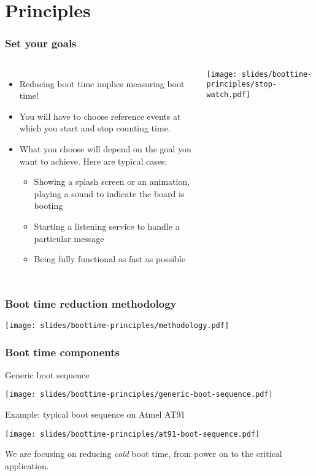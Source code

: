 \section{Principles}

\begin{frame}
\frametitle{Set your goals}
\begin{columns}
    \begin{itemize}
	\item Reducing boot time implies measuring boot time!
	\item You will have to choose reference events at which you
       	      start and stop counting time.
	\item What you choose will depend on the goal you want to
              achieve. Here are typical cases:
	\begin{itemize}
		\item Showing a splash screen or an animation, playing a sound to
	              indicate the board is booting
		\item Starting a listening service to handle a particular
	              message
	        \item Being fully functional as fast as possible
	\end{itemize}
    \end{itemize}
    \texttt{[image: slides/boottime-principles/stop-watch.pdf]}
  \end{columns}
\end{frame}

\begin{frame}
\frametitle{Boot time reduction methodology}
\begin{center}
    \texttt{[image: slides/boottime-principles/methodology.pdf]}
\end{center}
\end{frame}

\begin{frame}
\frametitle{Boot time components}
Generic boot sequence
\begin{center}
    \texttt{[image: slides/boottime-principles/generic-boot-sequence.pdf]}
\end{center}
Example: typical boot sequence on Atmel AT91
\begin{center}
    \texttt{[image: slides/boottime-principles/at91-boot-sequence.pdf]}
\end{center}
We are focusing on reducing {\em cold} boot time, from power on to the
critical application.
\end{frame}

